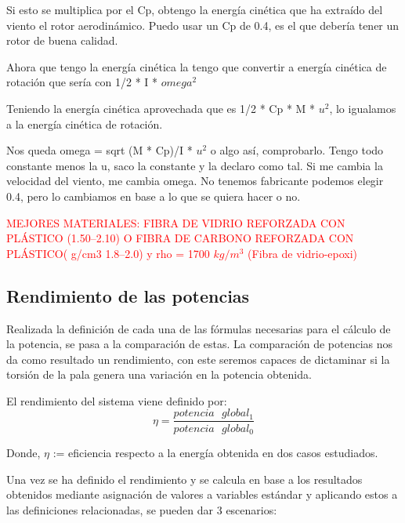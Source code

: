 Si esto se multiplica por el Cp, obtengo la energía cinética que ha extraído del viento el rotor aerodinámico. Puedo usar un Cp de 0.4, es el que debería tener un rotor de buena calidad. 

Ahora que tengo la energía cinética la tengo que convertir a energía cinética de rotación que sería con 1/2 * I * $omega^2$

Teniendo la energía cinética aprovechada que es 1/2 * Cp * M * $u^2$, lo igualamos a la energía cinética de rotación.

Nos queda omega = sqrt (M * Cp)/I * $u^2$ o algo así, comprobarlo. Tengo todo constante menos la u, saco la constante y la declaro como tal. Si me cambia la velocidad del viento, me cambia omega. No tenemos fabricante podemos elegir 0.4, pero lo cambiamos en base a lo que se quiera hacer o no. 
 
 
 
\textcolor{red}{\Large{MEJORES MATERIALES: FIBRA DE VIDRIO REFORZADA CON PLÁSTICO (1.50–2.10) O FIBRA DE CARBONO REFORZADA CON PLÁSTICO( g/cm3	1.8–2.0) y rho = 1700 $kg/m^3$ (Fibra de vidrio-epoxi) }}
 
 
 \subsection{Rendimiento de las potencias}
 \label{section:rendimiento}
 
Realizada la definición de cada una de las fórmulas necesarias para el cálculo de la potencia, se pasa a la comparación de estas. La comparación de potencias nos da como resultado un rendimiento, con este seremos capaces de dictaminar si la torsión de la pala genera una variación en la potencia obtenida.
 
   \begin{definicion}
El rendimiento del sistema viene definido por:
 $$ \eta = \dfrac{potencia \text{ } global_1}{potencia \text{ } global_0} $$ 
 
 Donde,
  \centering $\eta$ := eficiencia respecto a la energía obtenida en dos casos estudiados.
 \label{def:rendimiento_potencias}
 \end{definicion}
 
 Una vez se ha definido el rendimiento y se calcula en base a los resultados obtenidos mediante asignación de valores a variables estándar y aplicando estos a las definiciones relacionadas, se pueden dar 3 escenarios:
 

